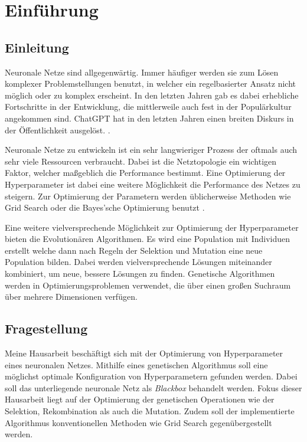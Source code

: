 \chapter{Einführung}
\section{Einleitung}\label{sec:einleitung}
Neuronale Netze sind allgegenwärtig. Immer häufiger werden sie zum Lösen komplexer Problemstellungen benutzt, in welcher ein regelbasierter Ansatz nicht möglich oder zu komplex erscheint. In den letzten Jahren gab es dabei erhebliche Fortschritte in der Entwicklung, die mittlerweile auch fest in der Populärkultur angekommen sind. ChatGPT hat in den letzten Jahren einen breiten Diskurs in der Öffentlichkeit ausgelöst. \parencite{wolfangel_chatgpt_2023}. 

Neuronale Netze zu entwickeln ist ein sehr langwieriger Prozess der oftmals auch sehr viele Ressourcen verbraucht. Dabei ist die Netztopologie ein wichtigen Faktor, welcher maßgeblich die Performance bestimmt. Eine Optimierung der Hyperparameter ist dabei eine weitere Möglichkeit die Performance des Netzes zu steigern. Zur Optimierung der Parametern werden üblicherweise Methoden wie Grid Search oder die Bayes’sche Optimierung benutzt  \parencite{hutter_hyperparameter_2019}. 

Eine weitere vielversprechende Möglichkeit zur Optimierung der Hyperparameter bieten die Evolutionären Algorithmen. Es wird eine Population mit Individuen erstellt welche dann nach Regeln der Selektion und Mutation eine neue Population bilden. Dabei werden vielversprechende Lösungen miteinander kombiniert, um neue, bessere Lösungen zu finden. Genetische Algorithmen werden in Optimierungsproblemen verwendet, die über einen großen Suchraum über mehrere Dimensionen verfügen. \parencite{stelldinger_naturanaloge_2024}

\section{Fragestellung}
Meine Hausarbeit beschäftigt sich mit der Optimierung von Hyperparameter eines neuronalen Netzes. Mithilfe eines genetischen Algorithmus soll eine möglichst optimale Konfiguration von Hyperparametern gefunden werden. Dabei soll das unterliegende neuronale Netz als \textit{Blackbox} behandelt werden. Fokus dieser Hausarbeit liegt auf der Optimierung der genetischen Operationen wie der Selektion, Rekombination als auch die Mutation. Zudem soll der implementierte Algorithmus konventionellen Methoden wie Grid Search gegenübergestellt werden.


